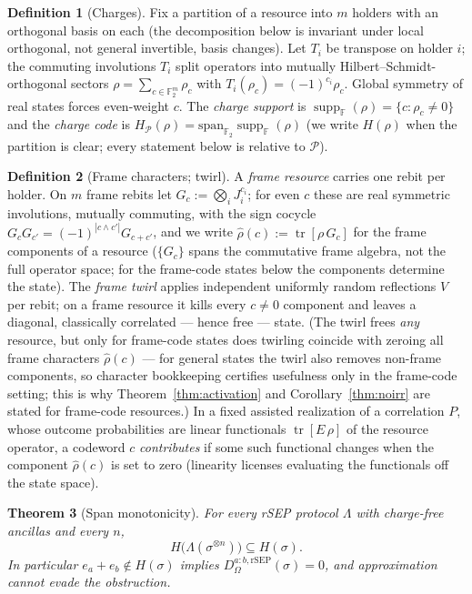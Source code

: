 \documentclass[11pt]{article}
\theoremstyle{plain}
\newtheorem{theorem}{Theorem}[section]
\theoremstyle{definition}
\newtheorem{definition}[theorem]{Definition}
\theoremstyle{remark}
\theoremstyle{plain}
\newcommand{\tr}{\operatorname{tr}}
\newcommand{\F}{\mathbb{F}}
\newcommand{\Om}{\Omega}
\newcommand{\suppF}{\operatorname{supp}_{\F}}
\begin{document}
\begin{definition}[Charges]\label{def:charge}
Fix a partition of a resource into $m$ holders with an orthogonal
basis on each (the decomposition below is invariant under local
orthogonal, not general invertible, basis changes). Let $T_i$ be
transpose on holder $i$; the commuting involutions $T_i$ split
operators into mutually Hilbert--Schmidt-orthogonal sectors
$\rho = \sum_{c\in\F_2^m}\rho_c$ with
$T_i(\rho_c) = (-1)^{c_i}\rho_c$. Global symmetry of real states
forces even-weight $c$. The \emph{charge support} is
$\suppF(\rho) = \{c:\rho_c\neq0\}$ and the \emph{charge code} is
$H_{\mathcal P}(\rho) = \mathrm{span}_{\F_2}\suppF(\rho)$
(we write $H(\rho)$ when the partition is clear; every statement
below is relative to $\mathcal P$).
\end{definition}

\begin{definition}[Frame characters; twirl]\label{def:walsh}
A \emph{frame resource} carries one rebit per holder. On $m$ frame
rebits let $G_c := \bigotimes_iJ_i^{c_i}$; for even $c$ these are
real symmetric involutions, mutually commuting, with the sign
cocycle $G_cG_{c'} = (-1)^{|c\wedge c'|}G_{c+c'}$, and we write
$\hat\rho(c) := \tr[\rho\,G_c]$ for the frame components of a
resource ($\{G_c\}$ spans the commutative frame algebra, not the
full operator space; for the frame-code states below the
components determine the state). The \emph{frame twirl} applies
independent uniformly random reflections $V$ per rebit; on a frame
resource it kills every $c\neq0$ component and leaves a diagonal,
classically correlated --- hence free --- state. (The twirl frees
\emph{any} resource, but only for frame-code states does twirling
coincide with zeroing all frame characters $\hat\rho(c)$ --- for
general states the twirl also removes non-frame components, so
character bookkeeping certifies usefulness only in the frame-code
setting; this is why Theorem~\ref{thm:activation} and
Corollary~\ref{thm:noirr} are stated for frame-code resources.) In a fixed assisted realization of a
correlation $P$, whose outcome probabilities are linear functionals
$\tr[E\,\rho]$ of the resource operator, a codeword $c$
\emph{contributes} if some such functional changes when the
component $\hat\rho(c)$ is set to zero (linearity licenses
evaluating the functionals off the state space).
\end{definition}

\begin{theorem}[Span monotonicity]\label{thm:span}
For every rSEP protocol $\Lambda$ with charge-free ancillas and
every $n$,
\[
H\bigl(\Lambda(\sigma^{\otimes n})\bigr)\subseteq H(\sigma).
\]
In particular $e_a + e_b\notin H(\sigma)$ implies
$D^{a:b,\mathrm{rSEP}}_\Om(\sigma) = 0$, and approximation cannot
evade the obstruction.
\end{theorem}
\end{document}
